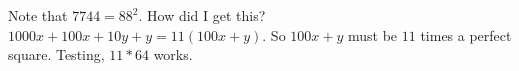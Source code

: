 Note that $7744=88^2$.
\newline \newline
How did I get this? $1000x+100x+10y+y=11(100x+y)$. So $100x+y$ must be $11$ times
a perfect square. Testing, $11*64$ works.

